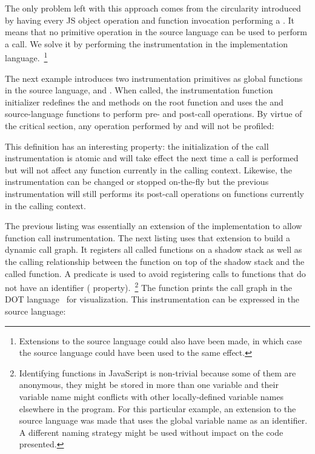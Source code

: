 The only problem left with this approach comes from the circularity introduced by
having every JS object operation and function invocation performing a
. It means that no primitive operation in the source language can be
used to perform a call. We solve it by performing the instrumentation in the
implementation language.~\footnote{Extensions to the source language could also
have been made, in which case the source language could have been used to the
same effect.}

The next example introduces two instrumentation primitives as global functions
in the source language,  and
. When called, the instrumentation function
initializer redefines the  and  methods on the root function
and uses the  and  source-language functions to perform
pre- and post-call operations.  By virtue of the critical section, any operation
performed by  and  will not be profiled:


This definition has an interesting property: the initialization of the call
instrumentation is atomic and will take effect the next time a call is
performed but will not affect any function currently in the calling context.
Likewise, the instrumentation can be changed or stopped on-the-fly but the
previous instrumentation will still performs its post-call operations on
functions currently in the calling context.

The previous listing was essentially an extension of the implementation to
allow function call instrumentation. The next listing uses that extension to
build a dynamic call graph. It registers all called functions on a shadow stack
as well as the calling relationship between the function on top of the shadow
stack and the called function. A predicate is used to avoid registering calls
to functions that do not have an identifier (
property).~\footnote{Identifying functions in JavaScript is non-trivial because
some of them are anonymous, they might be stored in more than one variable and
their variable name might conflicts with other locally-defined variable names
elsewhere in the program. For this particular example, an extension to the
source language was made that uses the global variable name as an identifier. A
different naming strategy might be used without impact on the code presented.}
The  function prints the call graph in the DOT
language~\cite{DOT} for visualization. This instrumentation can be
expressed in the source language:

